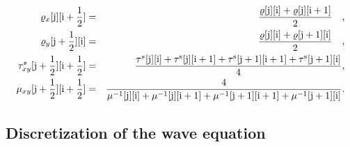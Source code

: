 \documentclass[11pt,onecolumn,oneside]{article}
\begin{document}
{\small 
\begin{eqnarray}
\varrho_x\rm{[j][i+\frac{1}{2}]}&=&\frac{\varrho\rm{[j][i]}+\varrho\rm{[j][i+1]}}{2}\quad\mbox{,}\nonumber\\
\varrho_y\rm{[j+\frac{1}{2}][i]}&=&\frac{\varrho\rm{[j][i]}+\varrho\rm{[j+1][i]}}{2}\quad\mbox{,}\nonumber\\
\tau^s_{xy}\rm{[j+\frac{1}{2}][i+\frac{1}{2}]}&=&\frac{\tau^s\rm{[j][i]}+\tau^s\rm{[j][i+1]}+\tau^s\rm{[j+1][i+1]}+\tau^s\rm{[j+1][i]}}{4}\mbox{,}\nonumber\\
\mu_{xy}\rm{[j+\frac{1}{2}][i+\frac{1}{2}]}&=&\frac{4}{\mu^{-1}\rm{[j][i]}+\mu^{-1}\rm{[j][i+1]}+\mu^{-1}\rm{[j+1][i+1]}+\mu^{-1}\rm{[j+1][i]}}\mbox{.}\nonumber\\
\label{eq_av_ssg}
\end{eqnarray}}
  

\subsection{Discretization of the wave equation}
\end{document}
